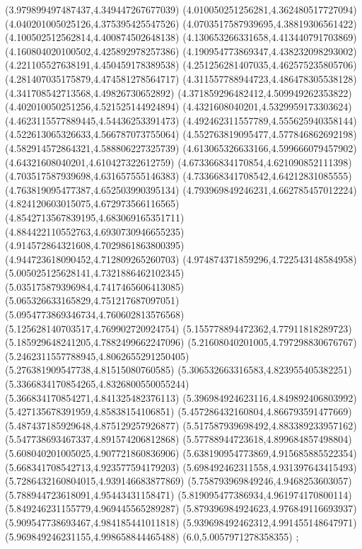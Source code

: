 {(3.979899497487437,4.349447267677039)
(4.010050251256281,4.362480517727094)
(4.040201005025126,4.375395425547526)
(4.0703517587939695,4.38819306561422)
(4.100502512562814,4.400874502648138)
(4.130653266331658,4.413440791703869)
(4.160804020100502,4.425892978257386)
(4.190954773869347,4.438232098293002)
(4.221105527638191,4.450459178389538)
(4.251256281407035,4.462575235805706)
(4.281407035175879,4.474581278564717)
(4.311557788944723,4.486478305538128)
(4.341708542713568,4.49826730652892)
(4.371859296482412,4.509949262353822)
(4.402010050251256,4.521525144924894)
(4.4321608040201,4.5329959173303624)
(4.4623115577889445,4.54436253391473)
(4.492462311557789,4.555625940358144)
(4.522613065326633,4.566787073755064)
(4.552763819095477,4.577846862692198)
(4.582914572864321,4.588806227325739)
(4.613065326633166,4.599666079457902)
(4.64321608040201,4.610427322612759)
(4.673366834170854,4.621090852111398)
(4.703517587939698,4.631657555146383)
(4.733668341708542,4.64212831085555)
(4.763819095477387,4.652503990395134)
(4.793969849246231,4.662785457012224)
(4.824120603015075,4.672973566116565)
(4.8542713567839195,4.683069165351711)
(4.884422110552763,4.6930730946655235)
(4.914572864321608,4.7029861863800395)
(4.944723618090452,4.712809265260703)
(4.974874371859296,4.722543148584958)
(5.005025125628141,4.7321886462102345)
(5.035175879396984,4.7417465606413085)
(5.065326633165829,4.751217687097051)
(5.0954773869346734,4.760602813576568)
(5.125628140703517,4.769902720924754)
(5.155778894472362,4.77911818289723)
(5.185929648241205,4.7882499662247096)
(5.21608040201005,4.797298830676767)
(5.2462311557788945,4.8062655291250405)
(5.276381909547738,4.81515080760585)
(5.306532663316583,4.823955405382251)
(5.3366834170854265,4.8326800550055244)
(5.366834170854271,4.841325482376113)
(5.396984924623116,4.849892406803992)
(5.427135678391959,4.85838154106851)
(5.457286432160804,4.866793591477669)
(5.487437185929648,4.875129257926877)
(5.517587939698492,4.883389233957162)
(5.547738693467337,4.891574206812868)
(5.57788944723618,4.899684857498804)
(5.608040201005025,4.907721860836906)
(5.638190954773869,4.915685885522354)
(5.668341708542713,4.923577594179203)
(5.698492462311558,4.931397643415493)
(5.7286432160804015,4.939146683877869)
(5.758793969849246,4.9468253603057)
(5.788944723618091,4.95443431158471)
(5.819095477386934,4.961974170800114)
(5.849246231155779,4.969445565289287)
(5.879396984924623,4.976849116693937)
(5.909547738693467,4.984185441011818)
(5.939698492462312,4.991455148647971)
(5.969849246231155,4.998658844465488)
(6.0,5.0057971278358355)
};
